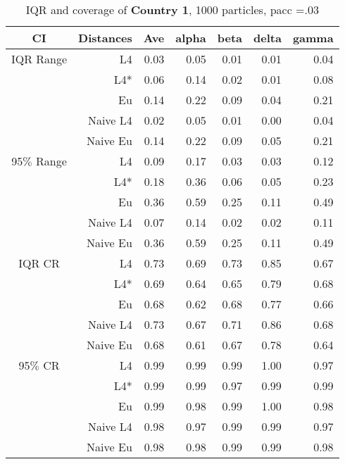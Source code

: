 \documentclass[a4paper,12pt,twoside]{book}
\begin{document}
\begin{table}[H]
\centering
\caption{IQR and coverage of \textbf{Country 1}, 1000 particles, pacc =.03}

\begin{tabular}{crrrrrr}
  \hline
{\color{blue}CI} & Distances & Ave & alpha & beta & delta & gamma \\ 
  \hline
{\color{blue}IQR Range} & L4  &0.03 & 0.05 & 0.01 & 0.01 & 0.04 \\ 
  
&L4*  &0.06 & 0.14 & 0.02 & 0.01 & 0.08 \\ 
  
&Eu &     0.14 & 0.22 & 0.09 & 0.04 & 0.21 \\ 
  
&Naive L4&0.02 & 0.05 & 0.01 & 0.00 & 0.04 \\ 
  
&Naive Eu &  0.14 & 0.22 & 0.09 & 0.05 & 0.21 \\ 
  
  
    {\color{blue}95$\%$ Range} & L4  &0.09 & 0.17 & 0.03 & 0.03 & 0.12 \\ 
  
    &L4*  &0.18 & 0.36 & 0.06 & 0.05 & 0.23 \\ 
  
&Eu &  0.36 & 0.59 & 0.25 & 0.11 & 0.49 \\ 
  
&Naive L4&   0.07 & 0.14 & 0.02 & 0.02 & 0.11 \\ 
 
&Naive Eu &   0.36 & 0.59 & 0.25 & 0.11 & 0.49 \\ 
  
   \hline
   
{\color{blue} IQR CR } & L4  &0.73 & 0.69 & 0.73 & 0.85 & 0.67 \\ 
 

&L4*  &   0.69 & 0.64 & 0.65 & 0.79 & 0.68 \\ 
  
 
&Eu &   0.68 & 0.62 & 0.68 & 0.77 & 0.66 \\ 
 
&Naive L4&   0.73 & 0.67 & 0.71 & 0.86 & 0.68 \\
&Naive Eu &  0.68 & 0.61 & 0.67 & 0.78 & 0.64 \\ 
   

 {\color{blue} 95$\%$ CR }& L4  &0.99 & 0.99 & 0.99 & 1.00 & 0.97 \\ 
 
 
  &L4*  &    0.99 & 0.99 & 0.97 & 0.99 & 0.99 \\ 
 
 
&Eu &     0.99 & 0.98 & 0.99 & 1.00 & 0.98 \\ 
  
&Naive L4&     0.98 & 0.97 & 0.99 & 0.99 & 0.97 \\ 
 
&Naive Eu &    0.98 & 0.98 & 0.99 & 0.99 & 0.98 \\ 

\end{tabular}

\end{table}
\end{document}
